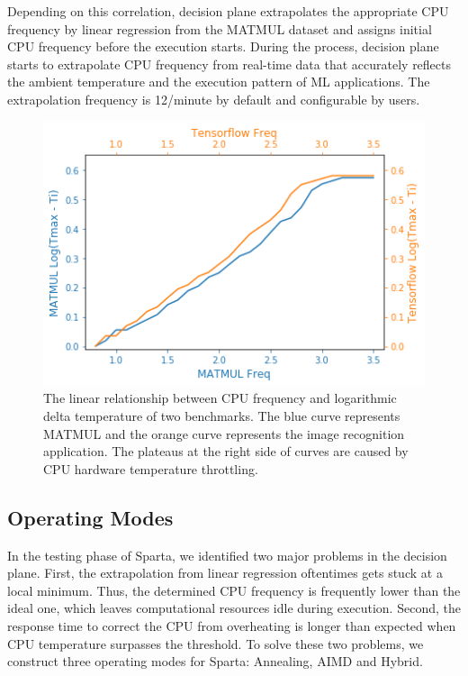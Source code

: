  Depending on this correlation, decision plane extrapolates the appropriate CPU frequency by linear regression from the MATMUL dataset and assigns initial CPU frequency before the execution starts. During the process, decision plane starts to extrapolate CPU frequency from real-time data that accurately reflects the ambient temperature and the execution pattern of ML applications. The extrapolation frequency is 12/minute by default and configurable by users.

\begin{figure}[ht]
\centering
\includegraphics[scale=0.5]{figures/matmul-tensorflow.png}
\caption{The linear relationship between CPU frequency and logarithmic delta temperature of two benchmarks. The blue curve represents MATMUL and the orange curve represents the image recognition application. The plateaus at the right side of curves are caused by CPU hardware temperature throttling. } \label{fig:mat-vs-tf}
\end{figure}


\subsection{Operating Modes}

In the testing phase of Sparta, we identified two major problems in the decision plane. First, the extrapolation from linear regression oftentimes gets stuck at a local minimum. Thus, the determined CPU frequency is frequently lower than the ideal one, which leaves computational resources idle during execution. Second, the response time to correct the CPU from overheating is longer than expected when CPU temperature surpasses the threshold. To solve these two problems, we construct three operating modes for Sparta: Annealing, AIMD and Hybrid. 

